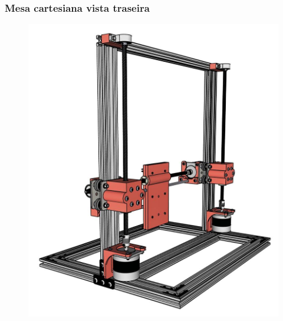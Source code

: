 \begin{frame}
    \frametitle{Mesa cartesiana vista traseira}  
        \begin{figure}
            \centering
            \includegraphics[scale = 0.15]{figuras/mesacartesianaperfiltraseira}
        \end{figure}
\end{frame}


